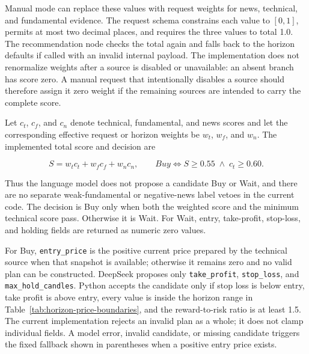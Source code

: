 Manual mode can replace these values with request weights for news, technical, and fundamental evidence. The request schema constrains each value to $[0,1]$, permits at most two decimal places, and requires the three values to total 1.0. The recommendation node checks the total again and falls back to the horizon defaults if called with an invalid internal payload. The implementation does not renormalize weights after a source is disabled or unavailable: an absent branch has score zero. A manual request that intentionally disables a source should therefore assign it zero weight if the remaining sources are intended to carry the complete score.

Let $c_t$, $c_f$, and $c_n$ denote technical, fundamental, and news scores and let the corresponding effective request or horizon weights be $w_t$, $w_f$, and $w_n$. The implemented total score and decision are

\begin{equation}
    S = w_t c_t + w_f c_f + w_n c_n,
    \qquad
    \textit{Buy} \iff S \geq 0.55 \;\land\; c_t \geq 0.60.
    \label{eq:recommendation-score}
\end{equation}

Thus the language model does not propose a candidate Buy or Wait, and there are no separate weak-fundamental or negative-news label vetoes in the current code. The decision is Buy only when both the weighted score and the minimum technical score pass. Otherwise it is Wait. For Wait, entry, take-profit, stop-loss, and holding fields are returned as numeric zero values.

For Buy, \texttt{entry\_price} is the positive current price prepared by the technical source when that snapshot is available; otherwise it remains zero and no valid plan can be constructed. DeepSeek proposes only \texttt{take\_profit}, \texttt{stop\_loss}, and \texttt{max\_hold\_candles}. Python accepts the candidate only if stop loss is below entry, take profit is above entry, every value is inside the horizon range in Table~\ref{tab:horizon-price-boundaries}, and the reward-to-risk ratio is at least 1.5. The current implementation rejects an invalid plan as a whole; it does not clamp individual fields. A model error, invalid candidate, or missing candidate triggers the fixed fallback shown in parentheses when a positive entry price exists.

